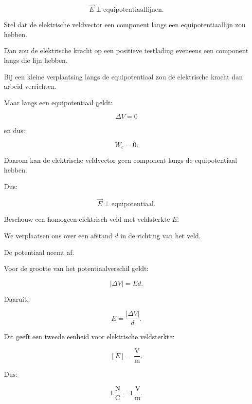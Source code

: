 \documentclass{ximera}
\begin{document}
\[
\boxed{
\vec E
\perp
\text{equipotentiaallijnen}.
}
\]




Stel dat de elektrische veldvector een component langs een
equipotentiaallijn zou hebben.

Dan zou de elektrische kracht op een positieve testlading eveneens een
component langs die lijn hebben.

Bij een kleine verplaatsing langs de equipotentiaal zou de elektrische
kracht dan arbeid verrichten.

Maar langs een equipotentiaal geldt:

\[
\Delta V=0
\]

en dus:

\[
W_e=0.
\]

Daarom kan de elektrische veldvector geen component langs de
equipotentiaal hebben.

Dus:

\[
\boxed{
\vec E\perp\text{equipotentiaal}.
}
\]




Beschouw een homogeen elektrisch veld met veldsterkte $E$.

We verplaatsen ons over een afstand $d$ in de richting van het veld.

De potentiaal neemt af.

Voor de grootte van het potentiaalverschil geldt:

\[
\boxed{
|\Delta V|=Ed.
}
\]

Daaruit:

\[
\boxed{
E=\frac{|\Delta V|}{d}.
}
\]


Dit geeft een tweede eenheid voor elektrische veldsterkte:

\[
[E]
=
\frac{\mathrm V}{\mathrm m}.
\]

Dus:

\[
\boxed{
1\,\mathrm{\frac NC}
=
1\,\mathrm{\frac Vm}.
}
\]


\end{document}
